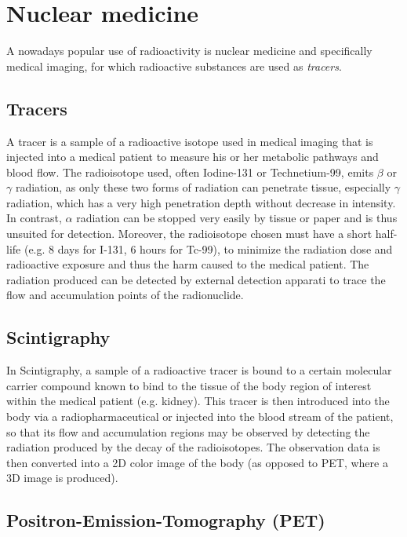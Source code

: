 \section*{Nuclear medicine}

A nowadays popular use of radioactivity is nuclear medicine and specifically medical imaging, for which radioactive substances are used as \emph{tracers}.

\subsection*{Tracers}

A tracer is a sample of a radioactive isotope used in medical imaging that is injected into a medical patient to measure his or her metabolic pathways and blood flow. The radioisotope used, often Iodine-131 or Technetium-99, emits $\beta$ or $\gamma$ radiation, as only these two forms of radiation can penetrate tissue, especially $\gamma$ radiation, which has a very high penetration depth without decrease in intensity. In contrast, $\alpha$ radiation can be stopped very easily by tissue or paper and is thus unsuited for detection. Moreover, the radioisotope chosen must have a short half-life (e.g. 8 days for I-131, 6 hours for Tc-99), to minimize the radiation dose and radioactive exposure and thus the harm caused to the medical patient. The radiation produced can be detected by external detection apparati to trace the flow and accumulation points of the radionuclide.

\subsection*{Scintigraphy}

In Scintigraphy, a sample of a radioactive tracer is bound to a certain molecular carrier compound known to bind to the tissue of the body region of interest within the medical patient (e.g. kidney). This tracer is then introduced into the body via a radiopharmaceutical or injected into the blood stream of the patient, so that its flow and accumulation regions may be observed by detecting the radiation produced by the decay of the radioisotopes. The observation data is then converted into a 2D color image of the body (as opposed to PET, where a 3D image is produced).

\subsection*{Positron-Emission-Tomography (PET)}

